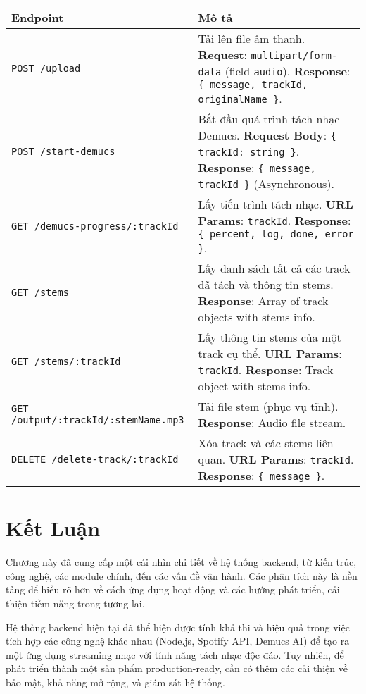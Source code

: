 \documentclass[12pt,a4paper]{article}
\begin{document}
\begin{longtable}{|p{4cm}|p{11cm}|}
\hline
\textbf{Endpoint} & \textbf{Mô tả} \\
\hline
\endhead

\texttt{POST /upload} & Tải lên file âm thanh. \textbf{Request}: \texttt{multipart/form-data} (field \texttt{audio}). \textbf{Response}: \texttt{\{ message, trackId, originalName \}}. \\
\hline

\texttt{POST /start-demucs} & Bắt đầu quá trình tách nhạc Demucs. \textbf{Request Body}: \texttt{\{ trackId: string \}}. \textbf{Response}: \texttt{\{ message, trackId \}} (Asynchronous). \\
\hline

\texttt{GET /demucs-progress/:trackId} & Lấy tiến trình tách nhạc. \textbf{URL Params}: \texttt{trackId}. \textbf{Response}: \texttt{\{ percent, log, done, error \}}. \\
\hline

\texttt{GET /stems} & Lấy danh sách tất cả các track đã tách và thông tin stems. \textbf{Response}: Array of track objects with stems info. \\
\hline

\texttt{GET /stems/:trackId} & Lấy thông tin stems của một track cụ thể. \textbf{URL Params}: \texttt{trackId}. \textbf{Response}: Track object with stems info. \\
\hline

\texttt{GET /output/:trackId/:stemName.mp3} & Tải file stem (phục vụ tĩnh). \textbf{Response}: Audio file stream. \\
\hline

\texttt{DELETE /delete-track/:trackId} & Xóa track và các stems liên quan. \textbf{URL Params}: \texttt{trackId}. \textbf{Response}: \texttt{\{ message \}}. \\
\hline
\end{longtable}

\section{Kết Luận}
\label{sec:conclusion}

Chương này đã cung cấp một cái nhìn chi tiết về hệ thống backend, từ kiến trúc, công nghệ, các module chính, đến các vấn đề vận hành. Các phân tích này là nền tảng để hiểu rõ hơn về cách ứng dụng hoạt động và các hướng phát triển, cải thiện tiềm năng trong tương lai.

Hệ thống backend hiện tại đã thể hiện được tính khả thi và hiệu quả trong việc tích hợp các công nghệ khác nhau (Node.js, Spotify API, Demucs AI) để tạo ra một ứng dụng streaming nhạc với tính năng tách nhạc độc đáo. Tuy nhiên, để phát triển thành một sản phẩm production-ready, cần có thêm các cải thiện về bảo mật, khả năng mở rộng, và giám sát hệ thống.
\end{document}
